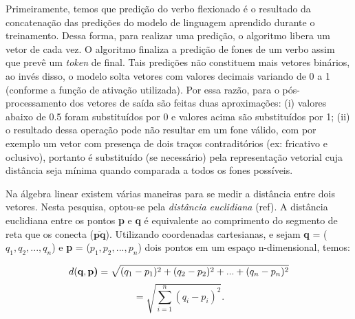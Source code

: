 Primeiramente, temos que predição do verbo flexionado é o resultado da concatenação das predições do modelo de linguagem aprendido durante o treinamento. Dessa forma, para realizar uma predição, o algoritmo libera um vetor de cada vez. O algoritmo finaliza a predição de fones de um verbo assim que prevê um \textit{token} de final. Tais predições não constituem mais vetores binários, ao invés disso, o modelo solta vetores com valores decimais variando de 0 a 1 (conforme a função de ativação utilizada). Por essa razão, para o pós-processamento dos vetores de saída são feitas duas aproximações: (i) valores abaixo de 0.5 foram substituídos por 0 e valores acima são substituídos por 1; (ii) o resultado dessa operação pode não resultar em um fone válido, com por exemplo um vetor com presença de dois traços contraditórios (ex: fricativo e oclusivo), portanto é substituído (se necessário) pela representação vetorial cuja distância seja mínima quando comparada a todos os fones possíveis. 

Na álgebra linear existem várias maneiras para se medir a distância entre dois vetores. Nesta pesquisa, optou-se pela \textit{distância euclidiana} (ref). A distância euclidiana entre os pontos \textbf{p} e \textbf{q} é equivalente ao comprimento do segmento de reta que os conecta (${\displaystyle {\overline {\mathbf {p} \mathbf {q} }}}$). Utilizando coordenadas cartesianas, e sejam \textbf{q} = ($q_1, q_2, ..., q_n$) e \textbf{p} = ($p_1, p_2, ..., p_n$) dois pontos em um espaço n-dimensional, temos:

\begin{equation}
    d(\textbf{q}, \textbf{p)} = \sqrt{(q_1 - p_1)^2 + (q_2 - p_2)^2 + ... + (q_n - p_n)^2}\notag
\end{equation}
\begin{equation}
    = \sqrt{\sum_{i=1}^n (q_i-p_i)^2}.    
\end{equation}




 



